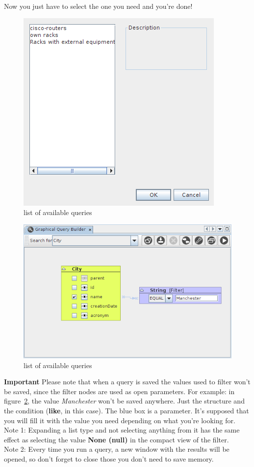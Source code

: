 \documentclass[a4paper]{article}
\begin{document}
	Now you just have to select the one you need and you're done! 
	\begin{figure}[h!]
		\centering
		\includegraphics[width=0.5\linewidth]{img/query_saved_queries.png}
		\caption{list of available queries}
		\label{fig:query_saved_queries}
	\end{figure}
	
	\begin{figure}[h!]
		\centering
		\includegraphics[width=0.7\linewidth]{img/query_filter_value_not_saved.png}
		\caption{list of available queries}
		\label{fig:query_filter_value_not_saved}
	\end{figure}
	
	\begin{framed} {\large \textbf{Important}}
		Please note that when a query is saved the values used to filter won't be saved, since the filter nodes are used as open parameters. For example: in figure~\ref{fig:query_filter_value_not_saved}, the value \textit{Manchester} won't be saved anywhere. Just the structure and the condition (\textbf{like}, in this case). The blue box is a parameter. It's supposed that you will fill it with the value you need depending on what you're looking for.
		\\Note 1: Expanding a list type and not selecting anything from it has the same effect as selecting the value \textbf{None (null)} in the compact view of the filter.
		\\Note 2: Every time you run a query, a new window with the results will be opened, so don't forget to close those you don't need to save memory.
	\end{framed}
	
\end{document}
